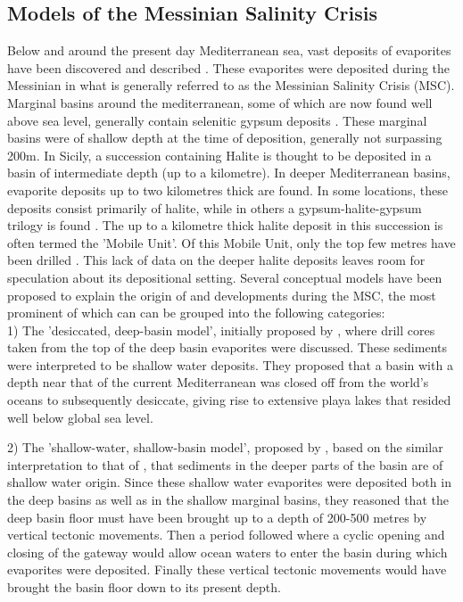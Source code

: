 \documentclass[twocolumn]{article}
\begin{document}
\subsection{Models of the Messinian Salinity Crisis}
Below and around the present day Mediterranean sea, vast deposits of evaporites have been discovered and described \citep{hsu1972origin, krijgsman1999chronology, rouchy2006messinian, roveri2014messinian, garcia2018geochemical}. These evaporites were deposited during the Messinian in what is generally referred to as the Messinian Salinity Crisis (MSC). Marginal basins around the mediterranean, some of which are now found well above sea level, generally contain selenitic gypsum deposits \citep{garcia2018geochemical}. These marginal basins were of shallow depth at the time of deposition, generally not surpassing 200m. In Sicily, a succession containing Halite is thought to be deposited in a basin of intermediate depth (up to a kilometre). In deeper Mediterranean basins, evaporite deposits up to two kilometres thick are found. In some locations, these deposits consist primarily of halite, while in others a gypsum-halite-gypsum trilogy is found \citep{roveri2014messinian}. The up to a kilometre thick halite deposit in this succession is often termed the 'Mobile Unit'. Of this Mobile Unit, only the top few metres have been drilled \citep{hsu1972origin}. This lack of data on the deeper halite deposits leaves room for speculation about its depositional setting. Several conceptual models have been proposed to explain the origin of and developments during the MSC, the most prominent of which can can be grouped into the following categories:\\

1) The 'desiccated, deep-basin model', initially proposed by \cite{hsu1972origin}, where drill cores taken from the top of the deep basin evaporites were discussed. These sediments were interpreted to be shallow water deposits. They proposed that a basin with a depth near that of the current Mediterranean was closed off from the world's oceans to subsequently desiccate, giving rise to extensive playa lakes that resided well below global sea level. 

2) The 'shallow-water, shallow-basin model', proposed by \cite{nesteroff1973mineralogy}, based on the similar interpretation to that of \cite{hsu1972origin}, that sediments in the deeper parts of the basin are of shallow water origin. Since these shallow water evaporites were deposited both in the deep basins as well as in the shallow marginal basins, they reasoned that the deep basin floor must have been brought up to a depth of 200-500 metres by vertical tectonic movements. Then a period followed where a cyclic opening and closing of the gateway would allow ocean waters to enter the basin during which evaporites were deposited. Finally these vertical tectonic movements would have brought the basin floor down to its present depth.
\end{document}
